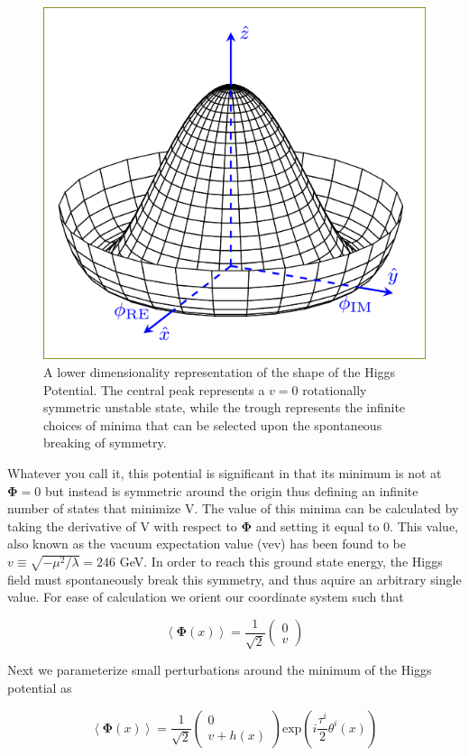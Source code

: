 \begin{figure}[!h]
  \begin{center}
    \includegraphics[width=0.4\linewidth]{figures/theory/higgs_potential.png}
    \caption{ A lower dimensionality representation of the shape of the Higgs
Potential.  The central peak represents a $v = 0$ rotationally symmetric
unstable state, while the trough represents the infinite choices of minima that
can be selected upon the spontaneous breaking of symmetry.}
    \label{fig:higgs_potential}
  \end{center}
\end{figure}

Whatever you call it, this potential is significant in
that its minimum is not at $\boldsymbol{\Phi} = 0$ but instead is symmetric
around the origin thus defining an infinite number of states that minimize V.
The value of this minima can be calculated by taking the derivative of V with
respect to $\boldsymbol{\Phi}$ and setting it equal to $0$. This value, also
known as the vacuum expectation value (vev) has been found to be $v \equiv
\sqrt{-\mu^{2}/\lambda} = 246$ GeV. In order to reach this ground state energy,
the Higgs field must spontaneously break this symmetry, and thus aquire an
arbitrary single value.  For ease of calculation we orient our coordinate system
such that

\begin{equation}
\left\langle \boldsymbol{\Phi}(x) \right\rangle = \frac{1}{\sqrt{2}} \left(
\begin{matrix} 0 \\ v \end{matrix} \right)
\end{equation} 

Next we parameterize small perturbations around the minimum of the Higgs
potential as 

\begin{equation} \label{eq:higgs:broken_higgs}
\left\langle \boldsymbol{\Phi}(x) \right\rangle = \frac{1}{\sqrt{2}} \left(
\begin{matrix} 0 \\ v + h(x) \end{matrix} \right) \text{exp} \left(
i\frac{\tau^{i}}{2}\theta^{i}(x) \right)
\end{equation} 

